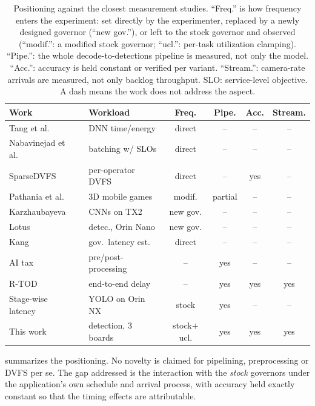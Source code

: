 \begin{table}[t]
\centering
\caption{Positioning against the closest measurement studies. ``Freq.''
is how frequency enters the experiment: set directly by the
experimenter, replaced by a newly designed governor (``new gov.''),
or left to the stock governor and observed (``modif.'': a modified
stock governor; ``ucl.'': per-task utilization clamping). ``Pipe.'':
the whole decode-to-detections pipeline is measured, not only the
model. ``Acc.'': accuracy is held constant or verified per variant.
``Stream.'': camera-rate arrivals are measured, not only backlog
throughput. SLO: service-level objective. A dash means the work does
not address the aspect.}
\label{tab:related}
\scriptsize
\setlength{\tabcolsep}{1.6pt}
\begin{tabular}{@{}l l cccc@{}}
\toprule
Work & Workload & Freq. & Pipe. & Acc. & Stream. \\
\midrule
Tang et al.~\cite{tang2019gpudvfs} & DNN time/energy & direct & -- & -- & -- \\
Nabavinejad et al.~\cite{nabavinejad2022batching} & batching w/ SLOs & direct & -- & -- & -- \\
SparseDVFS~\cite{zhang2026sparsedvfs} & per-operator DVFS & direct & -- & yes & -- \\
Pathania et al.~\cite{pathania2014cpugpu} & 3D mobile games & modif. & partial & -- & -- \\
Karzhaubayeva~\cite{karzhaubayeva2023cpugpu} & CNNs on TX2 & new gov. & -- & -- & -- \\
Lotus~\cite{gong2024lotus} & detec., Orin Nano & new gov. & -- & -- & -- \\
Kang~\cite{kang2026emc} & gov.\ latency est. & direct & -- & -- & -- \\
AI tax~\cite{richins2020aitax} & pre/post-processing & -- & yes & -- & -- \\
R-TOD~\cite{jang2020rtod} & end-to-end delay & -- & yes & yes & yes \\
Stage-wise latency~\cite{zhang2026resolution} & YOLO on Orin NX & stock & yes & -- & -- \\
This work & detection, 3 boards & stock${+}$ucl. & yes & yes & yes \\
\bottomrule
\end{tabular}
\end{table}

 summarizes the positioning. No novelty is claimed
for pipelining, preprocessing or DVFS per se. The gap addressed is the
interaction with the \emph{stock} governors under the application's
own schedule and arrival process, with accuracy held exactly constant
so that the timing effects are attributable.
